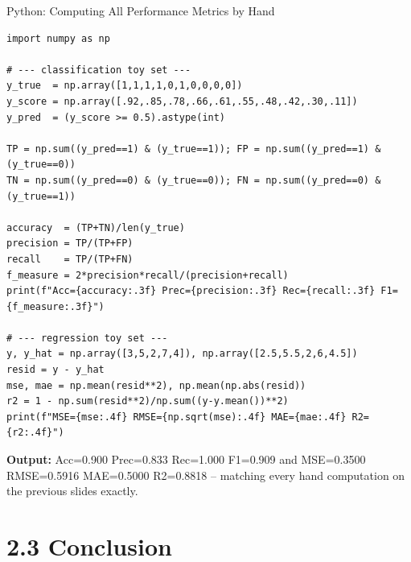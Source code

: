 \documentclass[aspectratio=169,10pt]{beamer}
\begin{document}
\begin{frame}[fragile]{Python: Computing All Performance Metrics by Hand}
  \begin{lstlisting}
import numpy as np

# --- classification toy set ---
y_true  = np.array([1,1,1,1,0,1,0,0,0,0])
y_score = np.array([.92,.85,.78,.66,.61,.55,.48,.42,.30,.11])
y_pred  = (y_score >= 0.5).astype(int)

TP = np.sum((y_pred==1) & (y_true==1)); FP = np.sum((y_pred==1) & (y_true==0))
TN = np.sum((y_pred==0) & (y_true==0)); FN = np.sum((y_pred==0) & (y_true==1))

accuracy  = (TP+TN)/len(y_true)
precision = TP/(TP+FP)
recall    = TP/(TP+FN)
f_measure = 2*precision*recall/(precision+recall)
print(f"Acc={accuracy:.3f} Prec={precision:.3f} Rec={recall:.3f} F1={f_measure:.3f}")

# --- regression toy set ---
y, y_hat = np.array([3,5,2,7,4]), np.array([2.5,5.5,2,6,4.5])
resid = y - y_hat
mse, mae = np.mean(resid**2), np.mean(np.abs(resid))
r2 = 1 - np.sum(resid**2)/np.sum((y-y.mean())**2)
print(f"MSE={mse:.4f} RMSE={np.sqrt(mse):.4f} MAE={mae:.4f} R2={r2:.4f}")
  \end{lstlisting}
  \textbf{Output:} {\ttfamily Acc=0.900 Prec=0.833 Rec=1.000 F1=0.909} and
  {\ttfamily MSE=0.3500 RMSE=0.5916 MAE=0.5000 R2=0.8818} -- matching every
  hand computation on the previous slides exactly.
\end{frame}

\section{2.3 Conclusion}
\end{document}
